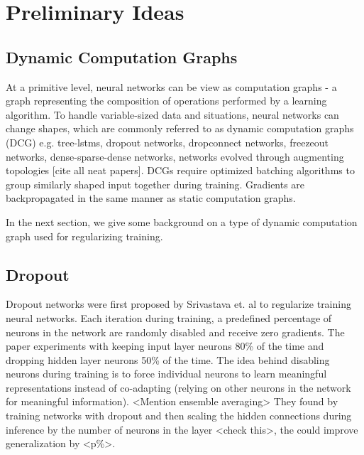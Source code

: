 \chapter{Preliminary Ideas}
\label{chapter:body}
\thispagestyle{myheadings}

\graphicspath{{2_Body/Figures/}}

\section{Dynamic Computation Graphs}
At a primitive level, neural networks can be view as computation graphs - a graph representing the composition of operations performed by a learning algorithm. To handle variable-sized data and situations, neural networks can change shapes, which are commonly referred to as dynamic computation graphs (DCG) e.g. tree-lstms, dropout networks, dropconnect networks, freezeout networks, dense-sparse-dense networks, networks evolved through augmenting topologies [cite all neat papers]. DCGs require optimized batching algorithms to group similarly shaped input together during training. Gradients are backpropagated in the same manner as static computation graphs.

In the next section, we give some background on a type of dynamic computation graph used for regularizing training.


\section{Dropout}
Dropout networks were first proposed by Srivastava et. al to regularize training neural networks. Each iteration during training, a predefined percentage of neurons in the network are randomly disabled and receive zero gradients. The paper experiments with keeping input layer neurons 80\% of the time and dropping hidden layer neurons 50\% of the time. The idea behind disabling neurons during training is to force individual neurons to learn meaningful representations instead of co-adapting (relying on other neurons in the network for meaningful information). <Mention ensemble averaging> They found by training networks with dropout and then scaling the hidden connections during inference by the number of neurons in the layer <check this>, the could improve generalization by <p\%>. 

